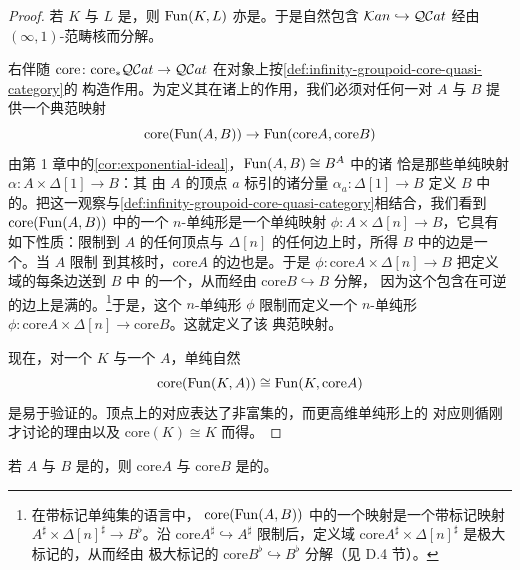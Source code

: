 \begin{proof}
若 $K$ 与 $L$ 是\trKanComplex，则 $\operatorname{Fun}(K,L)$ 亦是。于是自然包含
$\mathcal{K}an\hookrightarrow\mathcal{Q}\mathcal{C}at$ 经由 $(\infty,1)$-范畴核而分解。

右伴随 $\mathrm{core}\colon\mathrm{core}_{\ast}\mathcal{Q}\mathcal{C}at\to\mathcal{Q}\mathcal{C}at$ 在对象上按\cref{def:infinity-groupoid-core-quasi-category}的
构造作用。为定义其在诸\trFunctorSpace{}上的作用，我们必须对任何一对%
\trQuasiCategory{} $A$ 与 $B$ 提供一个典范映射
\begin{equation*}
\mathrm{core}(\operatorname{Fun}(A,B))\to\operatorname{Fun}(\mathrm{core}A,\mathrm{core}B)
\end{equation*}
由第 1 章中的\cref{cor:exponential-ideal}，$\operatorname{Fun}(A,B)\cong B^{A}$ 中的诸%
\trIsomorphism{}恰是那些单纯映射 $\alpha\colon A\times\Delta[1]\to B$：其
由 $A$ 的顶点 $a$ 标引的诸分量 $\alpha_{a}\colon\Delta[1]\to B$ 定义 $B$ 中
的\trIsomorphism。把这一观察与\cref{def:infinity-groupoid-core-quasi-category}相结合，我们看到
$\mathrm{core}(\operatorname{Fun}(A,B))$ 中的一个 $n$-单纯形是一个单纯映射
$\phi\colon A\times\Delta[n]\to B$，它具有如下性质：限制到 $A$ 的任何顶点与
$\Delta[n]$ 的任何边上时，所得 $B$ 中的边是一个\trIsomorphism。当 $A$ 限制
到其\trKanComplex{}核时，$\mathrm{core}A$ 的边也是\trIsomorphism。于是
$\phi\colon\mathrm{core}A\times\Delta[n]\to B$ 把定义域的每条边送到 $B$ 中
的一个\trIsomorphism，从而经由 $\mathrm{core}B\hookrightarrow B$ 分解，
因为这个包含在可逆的边上是满的。\footnote{在带标记单纯集的语言中，
$\mathrm{core}(\operatorname{Fun}(A,B))$ 中的一个映射是一个带标记映射
$A^{\sharp}\times\Delta[n]^{\sharp}\to B^{\flat}$。沿
$\mathrm{core}A^{\sharp}\hookrightarrow A^{\sharp}$ 限制后，定义域
$\mathrm{core}A^{\sharp}\times\Delta[n]^{\sharp}$ 是极大标记的，从而经由
极大标记的 $\mathrm{core}B^{\flat}\hookrightarrow B^{\flat}$ 分解（见 D.4
节）。}于是，这个 $n$-单纯形 $\phi$ 限制而定义一个 $n$-单纯形
$\phi\colon\mathrm{core}A\times\Delta[n]\to\mathrm{core}B$。这就定义了该
典范映射。

现在，对一个\trKanComplex{} $K$ 与一个\trQuasiCategory{} $A$，单纯自然%
\trIsomorphism
\begin{equation*}
\mathrm{core}(\operatorname{Fun}(K,A))\cong\operatorname{Fun}(K,\mathrm{core}A)
\end{equation*}
是易于验证的。顶点上的对应表达了非富集的\trAdjunction，而更高维单纯形上的
对应则循刚才讨论的理由以及\trIsomorphism{} $\mathrm{core}(K)\cong K$ 而得。
\end{proof}

\begin{corollary}\label{cor:core-of-equivalent-quasi-categories}
若 $A$ 与 $B$ 是\trEquivalence{}的\trQuasiCategory，则 $\mathrm{core}A$ 与
$\mathrm{core}B$ 是\trEquivalence{}的\trKanComplex。
\end{corollary}

